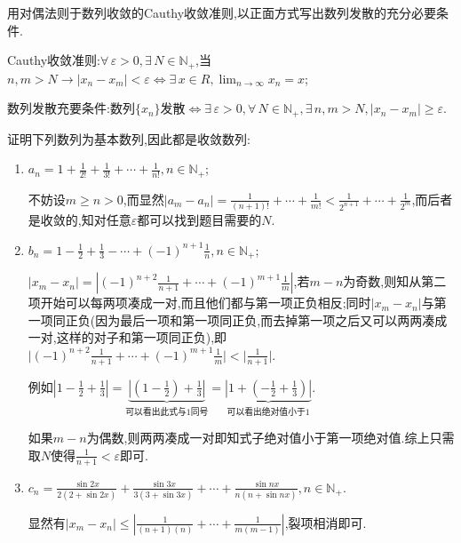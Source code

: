      \hypertarget{2.4.p.2}{}
     \begin{exercise}
         用对偶法则于数列收敛的Cauthy收敛准则,以正面方式写出数列发散的充分必要条件.
     \end{exercise}
     \begin{solution}

         Cauthy收敛准则:$\forall\, \varepsilon>0,\exists\, N\in \mathbb{N}_+$,当$ n,m>N\rightarrow\lvert x_n-x_m\rvert<\varepsilon\Longleftrightarrow \exists\, x\in R,\lim_{n\to\infty}x_n=x$;

         数列发散充要条件:数列$\{x_n\}$发散$\Longleftrightarrow \exists\, \varepsilon>0,\forall\, N\in \mathbb{N}_+,\exists\, n,m>N,\lvert x_n-x_m\rvert\geqslant \varepsilon$.
     \end{solution}

     \begin{exercise}
         证明下列数列为基本数列,因此都是收敛数列:
         \begin{enumerate}
             \item $a_n=1+\frac{1}{2!}+\frac{1}{3!}+\cdots+\frac{1}{n!},n\in \mathbb{N}_+$;
                   \begin{solution}
                       不妨设$m\geqslant n>0$,而显然$\lvert a_m-a_n\rvert=\frac{1}{(n+1)!}+\cdots+\frac{1}{m!}<\frac{1}{2^{n+1}}+\cdots+\frac{1}{2^m}$,而后者是收敛的,知对任意$\varepsilon$都可以找到题目需要的$N$.
                   \end{solution}
             \item $b_n=1-\frac{1}{2}+\frac{1}{3}-\cdots+(-1)^{n+1}\frac{1}{n},n\in \mathbb{N}_+$;
                   \begin{solution}
                       $\lvert x_m-x_n\rvert=\left|(-1)^{n+2}\frac{1}{n+1}+\cdots+(-1)^{m+1}\frac{1}{m}\right|$,若$m-n$为奇数,则知从第二项开始可以每两项凑成一对,而且他们都与第一项正负相反;同时$\lvert x_m-x_n\rvert$与第一项同正负(因为最后一项和第一项同正负,而去掉第一项之后又可以两两凑成一对,这样的对子和第一项同正负),即$\big\lvert (-1)^{n+2}\frac{1}{n+1}+\cdots+(-1)^{m+1}\frac{1}{m}\big\rvert<\lvert \frac{1}{n+1}\rvert$.

                       例如$\left|1-\frac{1}{2}+\frac{1}{3}\right|=\underbrace{\left|(1-\frac{1}{2})+\frac{1}{3}\right|}_{\text{可以看出此式与1同号}}=\underbrace{\left|1+(-\frac{1}{2}+\frac{1}{3})\right|}_{\text{可以看出绝对值小于1}}$.

                       如果$m-n$为偶数,则两两凑成一对即知式子绝对值小于第一项绝对值.综上只需取$N$使得$\frac{1}{n+1}<\varepsilon$即可.
                   \end{solution}
             \item $c_n=\frac{\sin2x}{2(2+\sin2x)}+\frac{\sin3x}{3(3+\sin3x)}+\cdots+\frac{\sin nx}{n(n+\sin nx)},n\in \mathbb{N}_+$.
                   \begin{solution}
                       显然有$\left|x_m-x_n\right|\leqslant\left|\frac{1}{(n+1)(n)}+\cdots+\frac{1}{m(m-1)}\right|$,裂项相消即可.
                   \end{solution}
         \end{enumerate}
     \end{exercise}

